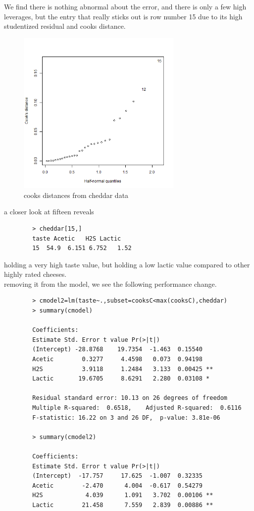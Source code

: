 \documentclass[11pt]{article}
\begin{document}
\begin{enumerate}
	 We find there is nothing abnormal about the error, and there is only a few high leverages, but the entry that really sticks out is row number 15 due to its high studentized residual and cooks distance.
	 
	 \begin{figure}[H]
	 	\centering
	 	\includegraphics[width=8cm,height=8cm]{cheddarCD.png}
	 	\caption[cheddarCD]{cooks distances from cheddar data}
	 	\label{CD check on teen gamb}
	 \end{figure}
	 
	 a closer look at fifteen reveals 
	 \begin{verbatim}
	 	> cheddar[15,]
	 	taste Acetic   H2S Lactic
	 	15  54.9  6.151 6.752   1.52
	 \end{verbatim}
	 holding a very high taste value, but holding a low lactic value compared to other highly rated cheeses.
	 \\
	 removing it from the model, we see the following performance change.
	 \begin{verbatim}
	 	> cmodel2=lm(taste~.,subset=cooksC<max(cooksC),cheddar)
	 	> summary(cmodel)
	 	
	 	Coefficients:
	 	Estimate Std. Error t value Pr(>|t|)   
	 	(Intercept) -28.8768    19.7354  -1.463  0.15540   
	 	Acetic        0.3277     4.4598   0.073  0.94198   
	 	H2S           3.9118     1.2484   3.133  0.00425 **
	 	Lactic       19.6705     8.6291   2.280  0.03108 * 
	 	
	 	Residual standard error: 10.13 on 26 degrees of freedom
	 	Multiple R-squared:  0.6518,	Adjusted R-squared:  0.6116 
	 	F-statistic: 16.22 on 3 and 26 DF,  p-value: 3.81e-06
	 	
	 	> summary(cmodel2)
	 	
	 	Coefficients:
	 	Estimate Std. Error t value Pr(>|t|)   
	 	(Intercept)  -17.757     17.625  -1.007  0.32335   
	 	Acetic        -2.470      4.004  -0.617  0.54279   
	 	H2S            4.039      1.091   3.702  0.00106 **
	 	Lactic        21.458      7.559   2.839  0.00886 **
	 	

\end{verbatim}
\end{enumerate}
\end{document}

